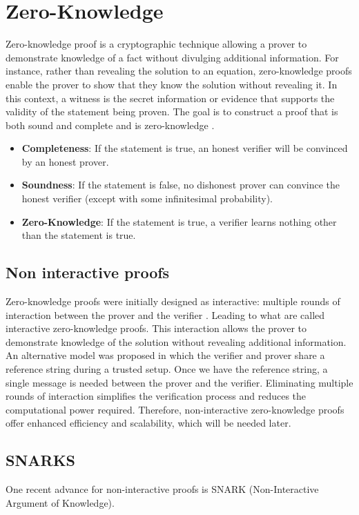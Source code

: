 \section{Zero-Knowledge}
Zero-knowledge proof is a cryptographic technique allowing a prover to demonstrate knowledge of a fact without divulging additional information. 
For instance, rather than revealing the solution to an equation, zero-knowledge proofs enable the prover to show that they know the solution without revealing it. 
In this context, a witness is the secret information or evidence that supports the validity of the statement being proven. 
The goal is to construct a proof that is both sound and complete and is zero-knowledge \cite{LZK}.

\label{subsec:zkp}
\begin{itemize}
\item \textbf{Completeness}: If the statement is true, an honest verifier will be convinced by an honest prover.
\item \textbf{Soundness}: If the statement is false, no dishonest prover can convince the honest verifier (except with some infinitesimal probability).
\item \textbf{Zero-Knowledge}: If the statement is true,  a verifier learns nothing other than the statement is true. \cite{LC23}
\end{itemize}


\subsection{Non interactive proofs}

Zero-knowledge proofs were initially designed as interactive: multiple rounds of interaction between the prover and the verifier \cite{GMR89}.
Leading to what are called interactive zero-knowledge proofs. This interaction allows the prover to demonstrate knowledge of the solution without revealing additional information.
An alternative model was proposed in which the verifier and prover share a reference string during a trusted setup. Once we have the reference string, a single message is needed between the prover and the verifier.
Eliminating multiple rounds of interaction simplifies the verification process and reduces the computational power required.
Therefore, non-interactive zero-knowledge proofs offer enhanced efficiency and scalability, which will be needed later.  \cite{BFM88} \cite{GMW91}


\subsection{SNARKS}
One recent advance for non-interactive proofs is SNARK (Non-Interactive Argument of Knowledge).

